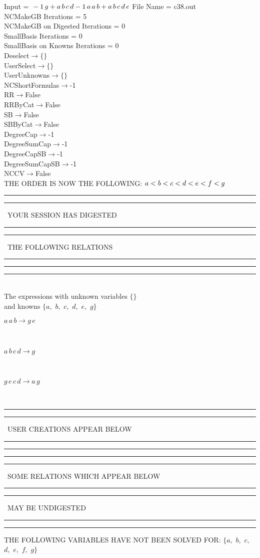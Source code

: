 \documentclass[rep10,leqno]{report}
\begin{document}
\normalsize
\baselineskip=12pt
\noindent
Input = 
$
\\-1\,
 g + a\,
 b\,
 c\,
 d\\
-1\,
 a\,
 a\,
 b + a\,
 b\,
 c\,
 d\,
 e\\
$
File Name = c38.out\\
NCMakeGB Iterations = 5\\
NCMakeGB on Digested Iterations = 0\\
SmallBasis Iterations = 0\\
SmallBasis on Knowns Iterations = 0\\
Deselect$\rightarrow \{\}$\\
UserSelect$\rightarrow \{\}$\\
UserUnknowns$\rightarrow \{\}$\\
NCShortFormulas$\rightarrow$-1\\
RR$\rightarrow $False\\
RRByCat$\rightarrow $False\\
SB$\rightarrow $False\\
SBByCat$\rightarrow $False\\
DegreeCap$\rightarrow $-1\\
DegreeSumCap$\rightarrow $-1\\
DegreeCapSB$\rightarrow $-1\\
DegreeSumCapSB$\rightarrow $-1\\
NCCV$\rightarrow $False\\
THE ORDER IS NOW THE FOLLOWING:\hfil\break
$
a<b<c<d<e<f<g\\
$
\rule[2pt]{6in}{4pt}\hfil\break
\rule[2pt]{1.879in}{4pt}
\ YOUR SESSION HAS DIGESTED\ 
\rule[2pt]{1.879in}{4pt}\hfil\break
\rule[2pt]{1.923in}{4pt}
\ THE FOLLOWING RELATIONS\ 
\rule[2pt]{1.923in}{4pt}\hfil\break
\rule[2pt]{6in}{4pt}\hfil\break
\rule[3pt]{6in}{.7pt}\\
The expressions with unknown variables $\{\}$\\
and knowns $\{a,
$ $
b,
$ $
c,
$ $
d,
$ $
e,
$ $
g\}$\smallskip\\
\begin{minipage}{6in}
$
a\,
 a\,
 b\rightarrow g\,
 e
$
\end{minipage}\medskip \\
\begin{minipage}{6in}
$
a\,
 b\,
 c\,
 d\rightarrow g
$
\end{minipage}\medskip \\
\begin{minipage}{6in}
$
g\,
 e\,
 c\,
 d\rightarrow a\,
 g
$
\end{minipage}\\
\rule[2pt]{6in}{1pt}\hfil\break
\rule[2.5pt]{1.701in}{1pt}
\ USER CREATIONS APPEAR BELOW\ 
\rule[2.5pt]{1.701in}{1pt}\hfil\break
\rule[2pt]{6in}{1pt}\hfil\break
\rule[2pt]{6in}{4pt}\hfil\break
\rule[2pt]{1.45in}{4pt}
\ SOME RELATIONS WHICH APPEAR BELOW\ 
\rule[2pt]{1.45in}{4pt}\hfil\break
\rule[2pt]{2.18in}{4pt}
\ MAY BE UNDIGESTED\ 
\rule[2pt]{2.18in}{4pt}\hfil\break
\rule[2pt]{6in}{4pt}\hfil\break
THE FOLLOWING VARIABLES HAVE NOT BEEN SOLVED FOR:\hfil\break
$\{a,
$ $
b,
$ $
c,
$ $
d,
$ $
e,
$ $
f,
$ $
g\}$
\smallskip\\
\vspace{10pt}
\end{document}
